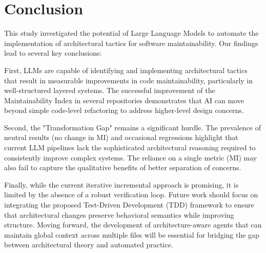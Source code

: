 \documentclass[sigconf,review]{acmart}
\begin{document}
\section{Conclusion}

This study investigated the potential of Large Language Models to automate the implementation of architectural tactics for software maintainability. Our findings lead to several key conclusions:

First, LLMs are capable of identifying and implementing architectural tactics that result in measurable improvements in code maintainability, particularly in well-structured layered systems. The successful improvement of the Maintainability Index in several repositories demonstrates that AI can move beyond simple code-level refactoring to address higher-level design concerns.

Second, the "Transformation Gap" remains a significant hurdle. The prevalence of neutral results (no change in MI) and occasional regressions highlight that current LLM pipelines lack the sophisticated architectural reasoning required to consistently improve complex systems. The reliance on a single metric (MI) may also fail to capture the qualitative benefits of better separation of concerns.

Finally, while the current iterative incremental approach is promising, it is limited by the absence of a robust verification loop. Future work should focus on integrating the proposed Test-Driven Development (TDD) framework to ensure that architectural changes preserve behavioral semantics while improving structure. Moving forward, the development of architecture-aware agents that can maintain global context across multiple files will be essential for bridging the gap between architectural theory and automated practice.


\end{document}
